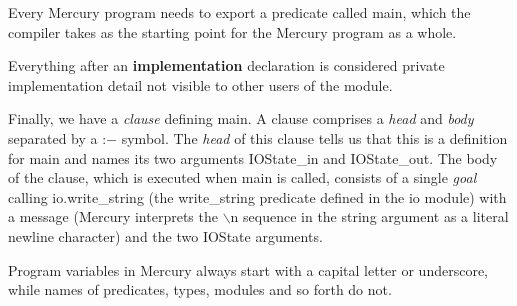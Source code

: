 \documentclass[a4paper,11pt,notitlepage,onecolumn]{book}
\begin{document}
Every Mercury program needs to export a predicate called \textsf{main}, which the
compiler takes as the starting point for the Mercury program as a whole.
\begin{small}

\begin{ptabular}
\nextline
\end{ptabular}

\end{small}
Everything after an \textsf{\textbf{implementation}} declaration is considered private
implementation detail not visible to other users of the module.
\begin{small}

\begin{ptabular}
\nextline
{}
\nextline
\end{ptabular}

\end{small}
Finally, we have a \emph{clause} defining \textsf{main}.  A clause comprises a
\emph{head} and \emph{body} separated by a \textsf{:{\ensuremath{-}}} symbol.  The \emph{head} of
this clause tells us that this is a definition for \textsf{main} and names its two
arguments \textsf{IOState\_in} and \textsf{IOState\_out}.  The body of the clause, which is executed
when \textsf{main} is called, consists of a single \emph{goal} calling
\textsf{io.write\_string} (\ie the \textsf{write\_string} predicate defined in the \textsf{io}
module) with a message (Mercury interprets the \textsf{{\ensuremath{\backslash}}n} sequence in the string
argument as a literal newline character) and the two \textsf{IOState} arguments.

Program variables in Mercury always start with a capital letter or
underscore, while names of predicates, types, modules and so forth do not.
\end{document}
